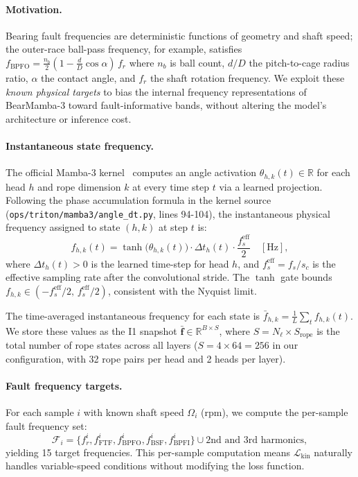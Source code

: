 \paragraph{Motivation.}
Bearing fault frequencies are deterministic functions of geometry and shaft
speed; the outer-race ball-pass frequency, for example, satisfies
$f_{\text{BPFO}} = \tfrac{n_b}{2}(1 - \tfrac{d}{D}\cos\alpha)\,f_r$
where $n_b$ is ball count, $d/D$ the pitch-to-cage radius ratio, $\alpha$
the contact angle, and $f_r$ the shaft rotation frequency.
We exploit these \emph{known physical targets} to bias the internal frequency
representations of BearMamba-3 toward fault-informative bands, without
altering the model's architecture or inference cost.

\paragraph{Instantaneous state frequency.}
The official Mamba-3 kernel~\cite{mamba3_2026} computes an angle activation
$\theta_{h,k}(t) \in \mathbb{R}$ for each head $h$ and rope dimension $k$ at
every time step $t$ via a learned projection.
Following the phase accumulation formula in the kernel source
(\texttt{ops/triton/mamba3/angle\_dt.py}, lines 94-104), the instantaneous
physical frequency assigned to state $(h,k)$ at step $t$ is:
\begin{equation}
  f_{h,k}(t)
    = \tanh\!\bigl(\theta_{h,k}(t)\bigr) \cdot \Delta t_h(t) \cdot \frac{f_s^{\text{eff}}}{2}
    \quad [\text{Hz}],
  \label{eq:finst}
\end{equation}
where $\Delta t_h(t) > 0$ is the learned time-step for head $h$, and
$f_s^{\text{eff}} = f_s / s_c$ is the effective sampling rate after the
convolutional stride.
The $\tanh$ gate bounds $f_{h,k} \in (-f_s^{\text{eff}}/2,\, f_s^{\text{eff}}/2)$,
consistent with the Nyquist limit.

The time-averaged instantaneous frequency for each state is
$\bar{f}_{h,k} = \tfrac{1}{L}\sum_t f_{h,k}(t)$.
We store these values as the I1 snapshot
$\bar{\mathbf{f}} \in \mathbb{R}^{B \times S}$,
where $S = N_\ell \times S_{\text{rope}}$ is the total number of rope states
across all layers ($S = 4 \times 64 = 256$ in our configuration,
with 32 rope pairs per head and 2 heads per layer).

\paragraph{Fault frequency targets.}
For each sample $i$ with known shaft speed $\Omega_i$ (rpm), we compute the
per-sample fault frequency set:
\begin{equation}
  \mathcal{F}_i = \{f_r^i, f_{\text{FTF}}^i, f_{\text{BPFO}}^i,
                    f_{\text{BSF}}^i, f_{\text{BPFI}}^i\}
    \cup \text{2nd and 3rd harmonics},
  \label{eq:faults}
\end{equation}
yielding 15 target frequencies.
This per-sample computation means $\mathcal{L}_{\text{kin}}$ naturally handles
variable-speed conditions without modifying the loss function.

